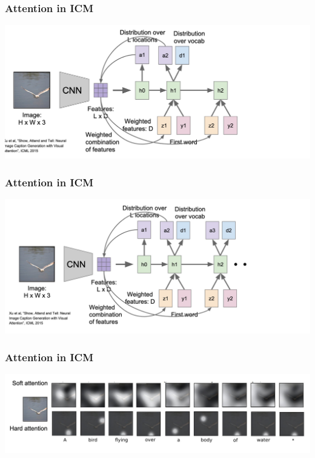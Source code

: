 \documentclass[aspectratio=1610]{beamer} %
\begin{document}
\begin{frame}
\frametitle{Attention in ICM}
\begin{center}
\includegraphics[width=1\textwidth]{pics/att6}
\end{center}
\end{frame}

\begin{frame}
\frametitle{Attention in ICM}
\begin{center}
\includegraphics[width=1\textwidth]{pics/att7}
\end{center}
\end{frame}

\begin{frame}
\frametitle{Attention in ICM}
\begin{center}
\includegraphics[width=1\textwidth]{pics/att8}
\end{center}
\end{frame}
\end{document}
